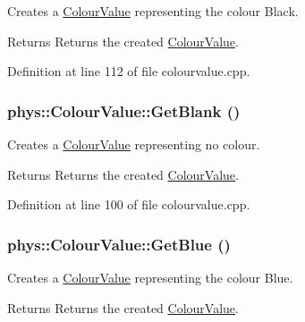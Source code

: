 Creates a \hyperlink{classphys_1_1ColourValue}{ColourValue} representing the colour Black. 

\begin{DoxyReturn}{Returns}
Returns the created \hyperlink{classphys_1_1ColourValue}{ColourValue}. 
\end{DoxyReturn}


Definition at line 112 of file colourvalue.cpp.

\hypertarget{classphys_1_1ColourValue_a80d899e82d1151487254b5c31a098a44}{
\subsubsection[{GetBlank}]{ phys::ColourValue::GetBlank ()}}
\label{d3/db0/classphys_1_1ColourValue_a80d899e82d1151487254b5c31a098a44}


Creates a \hyperlink{classphys_1_1ColourValue}{ColourValue} representing no colour. 

\begin{DoxyReturn}{Returns}
Returns the created \hyperlink{classphys_1_1ColourValue}{ColourValue}. 
\end{DoxyReturn}


Definition at line 100 of file colourvalue.cpp.

\hypertarget{classphys_1_1ColourValue_a75c9d235524e52c9347085e445a53671}{
\subsubsection[{GetBlue}]{ phys::ColourValue::GetBlue ()}}
\label{d3/db0/classphys_1_1ColourValue_a75c9d235524e52c9347085e445a53671}


Creates a \hyperlink{classphys_1_1ColourValue}{ColourValue} representing the colour Blue. 

\begin{DoxyReturn}{Returns}
Returns the created \hyperlink{classphys_1_1ColourValue}{ColourValue}. 
\end{DoxyReturn}



